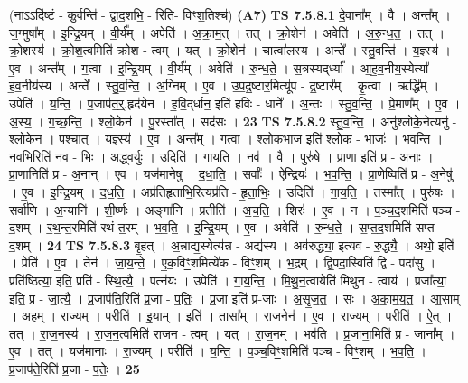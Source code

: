 \documentclass[17pt]{extarticle}
\begin{document}
                  \newline
                      (नाऽऽदि॑ष्टं - कु॒र्वन्ति॑ - द्वाद॒शभि॒ - रिति॑- विꣳश॒तिश्च॑)  \textbf{(A7)} \newline \newline
                                \textbf{ TS 7.5.8.1} \newline
                  दे॒वाना᳚म् । वै । अन्त᳚म् । ज॒ग्मुषा᳚म् । इ॒न्द्रि॒यम् । वी॒र्य᳚म् । अपेति॑ । अ॒क्रा॒म॒त् । तत् । क्रो॒शेन॑ । अवेति॑ । अ॒रु॒न्ध॒त॒ । तत् । क्रो॒शस्य॑ । क्रो॒श॒त्वमिति॑ क्रोश - त्वम् । यत् । क्रो॒शेन॑ । चात्वा॑लस्य । अन्ते᳚ । स्तु॒वन्ति॑ । य॒ज्ञ्स्य॑ । ए॒व । अन्त᳚म् । ग॒त्वा । इ॒न्द्रि॒यम् । वी॒र्य᳚म् । अवेति॑ । रु॒न्ध॒ते॒ । स॒त्रस्यद्‌र्ध्या᳚ । आ॒ह॒व॒नीय॒स्येत्या᳚ - ह॒व॒नीय॑स्य । अन्ते᳚ । स्तु॒व॒न्ति॒ । अ॒ग्निम् । ए॒व । उ॒प॒द्र॒ष्टार॒मित्यू॑प - द्र॒ष्टार᳚म् । कृ॒त्वा । ऋद्धि᳚म् । उपेति॑ । य॒न्ति॒ । प॒जाप॑त॒र्॒.हृद॑येन । ह॒वि॒द्‌र्धान॒ इति॑ हविः - धाने᳚ । अ॒न्तः । स्तु॒व॒न्ति॒ । प्रे॒माण᳚म् । ए॒व । अ॒स्य॒ । ग॒च्छ॒न्ति॒ । श्लो॒केन॑ । पु॒रस्ता᳚त् । सद॑सः । \textbf{  23} \newline
                  \newline
                                \textbf{ TS 7.5.8.2} \newline
                  स्तु॒व॒न्ति॒ । अनु॑श्लोके॒नेत्यनु॑ - श्लो॒के॒न॒ । प॒श्चात् । य॒ज्ञ्स्य॑ । ए॒व । अन्त᳚म् । ग॒त्वा । श्लो॒क॒भाज॒ इति॑ श्लोक - भाजः॑ । भ॒व॒न्ति॒ । न॒वभि॒रिति॑ न॒व - भिः॒ । अ॒द्ध्व॒र्युः । उदिति॑ । गा॒य॒ति॒ । नव॑ । वै । पुरु॑षे । प्रा॒णा इति॑ प्र - अ॒नाः । प्रा॒णानिति॑ प्र - अ॒नान् । ए॒व । यज॑मानेषु । द॒धा॒ति॒ । सर्वाः᳚ । ऐ॒न्द्रियः॑ । भ॒व॒न्ति॒ । प्रा॒णेष्विति॑ प्र - अ॒नेषु॑ । ए॒व । इ॒न्द्रि॒यम् । द॒ध॒ति॒ । अप्र॑तिहृताभि॒रित्यप्र॑ति - हृ॒ता॒भिः॒ । उदिति॑ । गा॒य॒ति॒ । तस्मा᳚त् । पुरु॑षः । सर्वा॑णि । अ॒न्यानि॑ । शी॒र्ष्णः । अङ्गा॑नि । प्रतीति॑ । अ॒च॒ति॒ । शिरः॑ । ए॒व । न । प॒ञ्च॒द॒शमिति॑ पञ्च - द॒शम् । र॒थ॒न्त॒रमिति॑ रथं-त॒रम् । भ॒व॒ति॒ । इ॒न्द्रि॒यम् । ए॒व । अवेति॑ । रु॒न्ध॒ते॒ । स॒प्त॒द॒शमिति॑ सप्त - द॒शम् । \textbf{  24} \newline
                  \newline
                                \textbf{ TS 7.5.8.3} \newline
                  बृ॒हत् । अ॒न्नाद्य॒स्येत्य॑न्न - अद्य॑स्य । अव॑रुद्ध्या॒ इत्यव॑ - रु॒द्ध्यै॒ । अथो॒ इति॑ । प्रेति॑ । ए॒व । तेन॑ । जा॒य॒न्ते॒ । ए॒क॒विꣳ॒॒शमित्ये॑क - विꣳ॒॒शम् । भ॒द्रम् । द्वि॒पदा॒स्विति॑ द्वि - पदा॑सु । प्रति॑ष्ठित्या॒ इति॒ प्रति॑ - स्थि॒त्यै॒ । पत्न॑यः । उपेति॑ । गा॒य॒न्ति॒ । मि॒थु॒न॒त्वायेति॑ मिथुन - त्वाय॑ । प्रजा᳚त्या॒ इति॒ प्र - जा॒त्यै॒ । प्र॒जाप॑ति॒रिति॑ प्र॒जा - प॒तिः॒ । प्र॒जा इति॑ प्र-जाः । अ॒सृ॒ज॒त॒ । सः । अ॒का॒म॒य॒त॒ । आ॒साम् । अ॒हम् । रा॒ज्यम् । परीति॑ । इ॒या॒म् । इति॑ । तासा᳚म् । रा॒ज॒नेन॑ । ए॒व । रा॒ज्यम् । परीति॑ । ऐ॒त् । तत् । रा॒ज॒नस्य॑ । रा॒ज॒न॒त्वमिति॑ राजन - त्वम् । यत् । रा॒ज॒नम् । भव॑ति । प्र॒जाना॒मिति॑ प्र - जाना᳚म् । ए॒व । तत् । यज॑मानाः । रा॒ज्यम् । परीति॑ । य॒न्ति॒ । प॒ञ्च॒विꣳ॒॒शमिति॑ पञ्च - विꣳ॒॒शम् । भ॒व॒ति॒ । प्र॒जाप॑ते॒रिति॑ प्र॒जा - प॒तेः॒ । \textbf{  25} \newline
\end{document}
